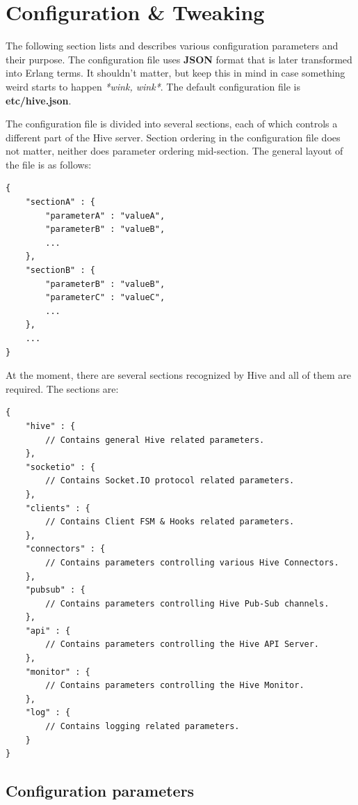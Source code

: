 \documentclass[a4paper]{article}
\begin{document}
\pagebreak
\section{Configuration \& Tweaking}
\label{sec-3}

The following section lists and describes various configuration parameters and their purpose. The configuration file uses \textbf{JSON} format that is later transformed into Erlang terms. It shouldn't matter, but keep this in mind in case something weird starts to happen \emph{*wink, wink*}. The default configuration file is \textbf{etc/hive.json}.

\noindent
The configuration file is divided into several sections, each of which controls a different part of the Hive server. Section ordering in the configuration file does not matter, neither does parameter ordering mid-section. The general layout of the file is as follows:


\begin{verbatim}
{
    "sectionA" : {
        "parameterA" : "valueA",
        "parameterB" : "valueB",
        ...
    },
    "sectionB" : {
        "parameterB" : "valueB",
        "parameterC" : "valueC",
        ...
    },
    ...
}
\end{verbatim}




\noindent
At the moment, there are several sections recognized by Hive and all of them are required. The sections are:


\begin{verbatim}
{
    "hive" : {
        // Contains general Hive related parameters.
    },
    "socketio" : {
        // Contains Socket.IO protocol related parameters.
    },
    "clients" : {
        // Contains Client FSM & Hooks related parameters.
    },
    "connectors" : {
        // Contains parameters controlling various Hive Connectors.
    },
    "pubsub" : {
        // Contains parameters controlling Hive Pub-Sub channels.
    },
    "api" : {
        // Contains parameters controlling the Hive API Server.
    },
    "monitor" : {
        // Contains parameters controlling the Hive Monitor.
    },
    "log" : {
        // Contains logging related parameters.
    }
}
\end{verbatim}
\subsection{Configuration parameters}
\label{sec-3-1}
\end{document}

